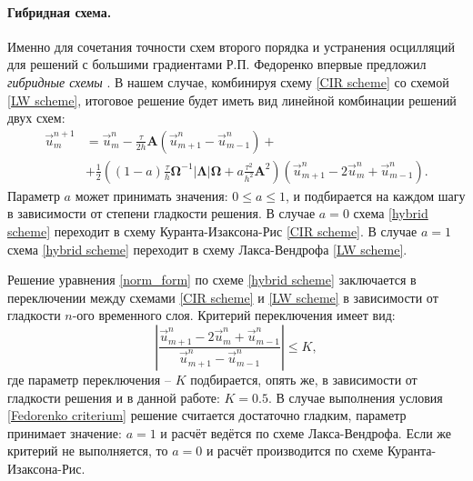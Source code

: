 \paragraph{Гибридная схема.} Именно для сочетания точности схем второго порядка и устранения осцилляций для решений с большими градиентами Р.П. Федоренко впервые предложил \textit{гибридные схемы} \cite{fedorenko}.
	В нашем случае, комбинируя схему \eqref{CIR scheme} со схемой \eqref{LW scheme}, итоговое решение будет иметь вид линейной комбинации решений двух схем:
\begin{align}
	\label{hybrid scheme}
	\vec{u}^{n+1}_m &= \vec{u}^n_m - \frac{\tau}{2h} \mathbf{A} (\vec{u}^n_{m+1} - \vec{u}^n_{m-1}) + \nonumber\\
		&+ \frac{1}{2} ((1-a) \frac{\tau}{h} \mathbf{\Omega}^{-1} |\mathbf{\Lambda}| \mathbf{\Omega} + a \frac{\tau^2}{h^2} \mathbf{A}^2 ) (\vec{u}^n_{m+1} - 2\vec{u}^n_m + \vec{u}^n_{m-1}).
\end{align}
	Параметр $a$ может принимать значения: $0 \leq a \leq 1$, и подбирается на каждом шагу в зависимости от степени гладкости решения. 
	В случае $a = 0$ схема \eqref{hybrid scheme} переходит в схему Куранта-Изаксона-Рис \eqref{CIR scheme}.
	В случае $a = 1$ схема \eqref{hybrid scheme} переходит в схему Лакса-Вендрофа \eqref{LW scheme}.
	
	Решение уравнения \eqref{norm_form} по схеме \eqref{hybrid scheme} заключается в переключении между схемами \eqref{CIR scheme} и \eqref{LW scheme} в зависимости от гладкости $n$-ого временного слоя.
	Критерий переключения имеет вид:
\begin{equation}
	\label{Fedorenko criterium}
	\left|\frac{\vec{u}^n_{m+1} - 2\vec{u}^n_m + \vec{u}^n_{m-1}}{\vec{u}^n_{m+1} - \vec{u}^n_{m-1}}\right| \le K,
\end{equation}
	где параметр переключения -- $K$ подбирается, опять же, в зависимости от гладкости решения и в данной работе: $K = 0.5$.
	В случае выполнения условия \eqref{Fedorenko criterium} решение считается достаточно гладким, параметр принимает значение: $a = 1$ и расчёт ведётся по схеме Лакса-Вендрофа.
	Если же критерий не выполняется, то $a = 0$ и расчёт производится по схеме Куранта-Изаксона-Рис.
	
